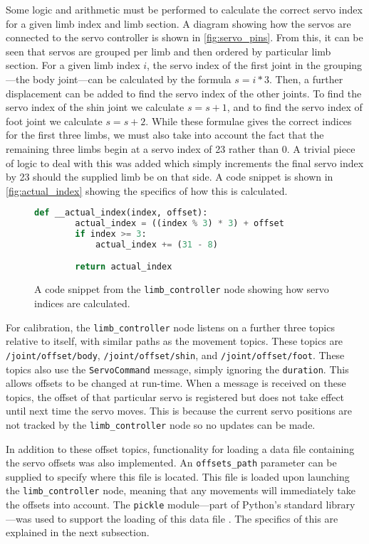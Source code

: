 Some logic and arithmetic must be performed to calculate the correct servo index for a given limb index and limb section. A diagram showing how the servos are connected to the servo controller is shown in \autoref{fig:servo_pins}. From this, it can be seen that servos are grouped per limb and then ordered by particular limb section. For a given limb index $i$, the servo index of the first joint in the grouping---the body joint---can be calculated by the formula $s = i * 3$. Then, a further displacement can be added to find the servo index of the other joints. To find the servo index of the shin joint we calculate $s = s + 1$, and to find the servo index of foot joint we calculate $s = s + 2$. While these formulae gives the correct indices for the first three limbs, we must also take into account the fact that the remaining three limbs begin at a servo index of 23 rather than 0. A trivial piece of logic to deal with this was added which simply increments the final servo index by 23 should the supplied limb be on that side. A code snippet is shown in \autoref{fig:actual_index} showing the specifics of how this is calculated.

\begin{figure}[!h]
    \centering
	\begin{lstlisting}[language=Python]
	def __actual_index(index, offset):
		actual_index = ((index % 3) * 3) + offset
		if index >= 3:
			actual_index += (31 - 8)

		return actual_index
	\end{lstlisting}
	\caption{A code snippet from the \texttt{limb\_controller} node showing how servo indices are calculated.}
	\label{fig:actual_index}
\end{figure}

For calibration, the \texttt{limb\_controller} node listens on a further three topics relative to itself, with similar paths as the movement topics. These topics are \texttt{/joint/offset/body}, \texttt{/joint/offset/shin}, and \texttt{/joint/offset/foot}. These topics also use the \texttt{ServoCommand} message, simply ignoring the \texttt{duration}. This allows offsets to be changed at run-time. When a message is received on these topics, the offset of that particular servo is registered but does not take effect until next time the servo moves. This is because the current servo positions are not tracked by the \texttt{limb\_controller} node so no updates can be made.

In addition to these offset topics, functionality for loading a data file containing the servo offsets was also implemented. An \texttt{offsets\_path} parameter can be supplied to specify where this file is located. This file is loaded upon launching the \texttt{limb\_controller} node, meaning that any movements will immediately take the offsets into account. The \texttt{pickle} module---part of Python's standard library---was used to support the loading of this data file \cite{pickle}. The specifics of this are explained in the next subsection.

